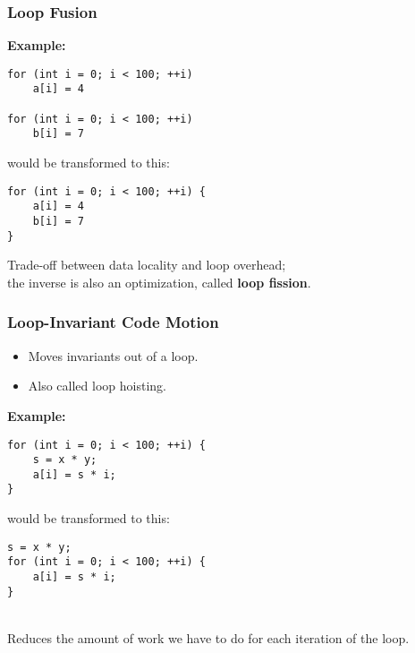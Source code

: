 \documentclass[aspectratio=43]{beamer}
\newenvironment{changemargin}[1]{%
  \begin{list}{}{%
    \setlength{\topsep}{0pt}%
    \setlength{\leftmargin}{#1}%
    \setlength{\rightmargin}{1em}
    \setlength{\listparindent}{\parindent}%
    \setlength{\itemindent}{\parindent}%
    \setlength{\parsep}{\parskip}%
  }%
  \item[]}{\end{list}}
\begin{document}
\begin{frame}[fragile]
  \frametitle{Loop Fusion}

  \begin{changemargin}{2cm}
  {\bf Example:}
  \begin{lstlisting}
for (int i = 0; i < 100; ++i)
    a[i] = 4

for (int i = 0; i < 100; ++i)
    b[i] = 7
  \end{lstlisting}
  would be transformed to this:
  \begin{lstlisting}
for (int i = 0; i < 100; ++i) {
    a[i] = 4
    b[i] = 7
}
  \end{lstlisting}
  \vfill
  Trade-off  between data locality and loop overhead; \\ 
  the inverse is also an optimization, called {\bf loop fission}.
  \end{changemargin}
\end{frame}

\begin{frame}[fragile]
  \frametitle{Loop-Invariant Code Motion}
  
  \begin{changemargin}{2cm}
  \begin{itemize}
    \item Moves invariants out of a loop.
    \item Also called loop hoisting.
  \end{itemize}

  {\bf Example:}
  \begin{lstlisting}
for (int i = 0; i < 100; ++i) {
    s = x * y;
    a[i] = s * i;
}
  \end{lstlisting}
  would be transformed to this:
  \begin{lstlisting}
s = x * y;
for (int i = 0; i < 100; ++i) {
    a[i] = s * i;
}
  \end{lstlisting}
~\\
  Reduces the amount of work we have to do for each iteration of the loop.
  \end{changemargin}
\end{frame}
\end{document}

